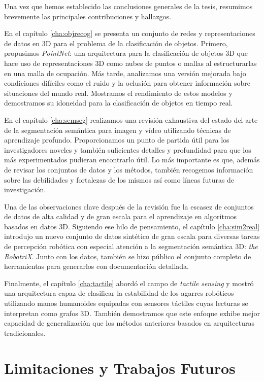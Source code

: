 Una vez que hemos establecido las conclusiones generales de la tesis, resumimos brevemente las principales contribuciones y hallazgos.

En el capítulo \ref{cha:objrecog} se presenta un conjunto de redes y representaciones de datos en 3D para el problema de la clasificación de objetos. Primero, propusimos \emph{PointNet}: una arquitectura para la clasificación de objetos \acs{3D} que hace uso de representaciones \acs{3D} como nubes de puntos o mallas al estructurarlas en una malla de ocupación. Más tarde, analizamos una versión mejorada bajo condiciones difíciles como el ruido y la oclusión para obtener información sobre situaciones del mundo real. Mostramos el rendimiento de estos modelos y demostramos su idoneidad para la clasificación de objetos en tiempo real.

En el capítulo \ref{cha:semseg} realizamos una revisión exhaustiva del estado del arte de la segmentación semántica para imagen y vídeo utilizando técnicas de aprendizaje profundo. Proporcionamos un punto de partida útil para los investigadores noveles y también suficientes detalles y profundidad para que los más experimentados pudieran encontrarlo útil. Lo más importante es que, además de revisar los conjuntos de datos y los métodos, también recogemos información sobre las debilidades y fortalezas de los mismos así como líneas futuras de investigación.

Una de las observaciones clave después de la revisión fue la escasez de conjuntos de datos de alta calidad y de gran escala para el aprendizaje en algoritmos basados en datos \ac{3D}. Siguiendo ese hilo de pensamiento, el capítulo \ref{cha:sim2real} introdujo un nuevo conjunto de datos sintético de gran escala para diversas tareas de percepción robótica con especial atención a la segmentación semántica 3D: \emph{the RobotriX}. Junto con los datos, también se hizo público el conjunto completo de herramientas para generarlos con documentación detallada.

Finalmente, el capítulo \ref{cha:tactile} abordó el campo de \emph{tactile sensing} y mostró una arquitectura capaz de clasificar la estabilidad de los agarres robóticos utilizando manos humanoides equipadas con sensores táctiles cuyas lecturas se interpretan como grafos \acs{3D}. También demostramos que este enfoque exhibe mejor capacidad de generalización que los métodos anteriores basados en arquitecturas tradicionales.

\section{Limitaciones y Trabajos Futuros}
\label{cha:conclusion_sp:sec:future}

